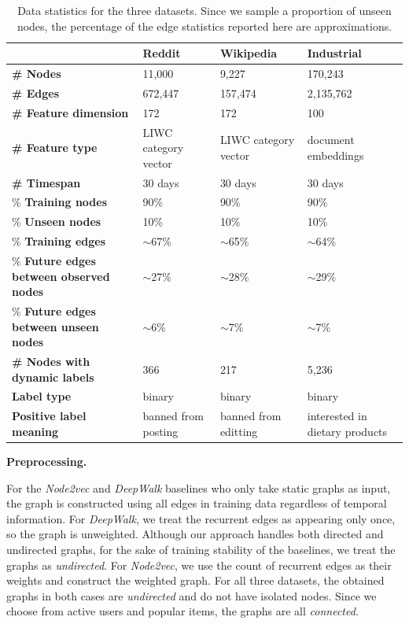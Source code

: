 \documentclass{article} %
\begin{document}
\begin{table}[]
    \centering
    \begin{tabular}{L{3.7cm}L{2.7cm}L{2.7cm}L{2.7cm}}
    \hline
         & \textbf{Reddit} & \textbf{Wikipedia} & \textbf{Industrial} \\ \hline
        \textbf{\# Nodes} & 11,000 & 9,227 & 170,243 \\ 
        \textbf{\# Edges} & 672,447 & 157,474 & 2,135,762 \\ 
        \textbf{\# Feature dimension} & 172 & 172 & 100 \\
        \textbf{\# Feature type} & LIWC category vector & LIWC category vector & document embeddings \\
        \textbf{\# Timespan} & 30 days & 30 days & 30 days \\
        \% \textbf{Training nodes} & 90\% & 90\% & 90\% \\ 
        \% \textbf{Unseen nodes} & 10\% & 10\% & 10\% \\
        \% \textbf{Training edges} & $\sim$67\% & $\sim$65\% & $\sim$64\% \\
        \% \textbf{Future edges between observed nodes} & $\sim$27\% & $\sim$28\% & $\sim$29\% \\
        \% \textbf{Future edges between unseen nodes} & $\sim$6\% &$\sim$7\% & $\sim$7\%\\
        \textbf{\# Nodes with dynamic labels} & 366 & 217 & 5,236\\
        \textbf{Label type} & binary & binary & binary \\
        \textbf{Positive label meaning} & banned from posting & banned from editting & interested in dietary products \\
    \hline
    \end{tabular}
    \caption{Data statistics for the three datasets. Since we sample a proportion of unseen nodes, the percentage of the edge statistics reported here are approximations.}
    \label{tab:stat}
\end{table}

\textbf{Preprocessing.} 

For the \textsl{Node2vec} and \textsl{DeepWalk} baselines who only take static graphs as input, the graph is constructed using all edges in training data regardless of temporal information. For \textsl{DeepWalk}, we treat the recurrent edges as appearing only once, so the graph is unweighted. Although our approach handles both directed and undirected graphs, for the sake of training stability of the baselines, we treat the graphs as \emph{undirected}. For \textsl{Node2vec}, we use the count of recurrent edges as their weights and construct the weighted graph. For all three datasets, the obtained graphs in both cases are \emph{undirected} and do not have isolated nodes. Since we choose from active users and popular items, the graphs are all \emph{connected}.  
\end{document}
